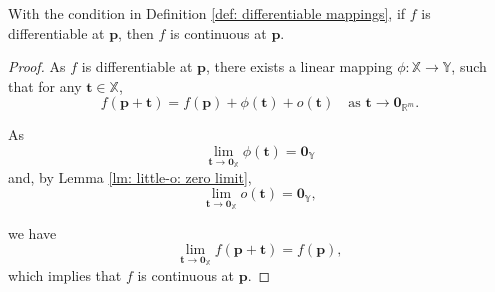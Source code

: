 \begin{lemma}
	With the condition in Definition \ref{def: differentiable mappings}, if $f$ is differentiable at $\mathbf p$, then $f$ is continuous at $\mathbf p$.
	
	\begin{proof}
		As $f$ is differentiable at $\mathbf p$, there exists a linear mapping $\phi: \mathbb X \to \mathbb Y$, such that for any $\mathbf t \in \mathbb X$,
		$$
		f(\mathbf p + \mathbf t) = f(\mathbf p) + \phi(\mathbf t) + o(\mathbf t) \quad \text{as $\mathbf t \to \mathbf 0_{\mathbb R^m}$}.
		$$
		
		As
		$$
		\lim_{\mathbf t \to \mathbf 0_{\mathbb X}} \phi(\mathbf t) = \mathbf 0_{\mathbb Y}
		$$
		and, by Lemma \ref{lm: little-o: zero limit},
		$$
		\lim_{\mathbf t \to \mathbf 0_{\mathbb X}}o(\mathbf t) = \mathbf 0_{\mathbb Y},
		$$
		
		we have
		$$
		\lim_{\mathbf t \to \mathbf 0_{\mathbb X}} f(\mathbf p + \mathbf t) = f(\mathbf p),
		$$
		which implies that $f$ is continuous at $\mathbf p$.
	\end{proof}
\end{lemma}



